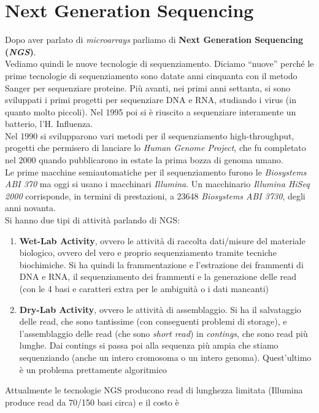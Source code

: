 \documentclass[a4paper,12pt, oneside]{book}
\begin{document}
\section{Next Generation Sequencing}
Dopo aver parlato di \textit{microarrays} parliamo di \textbf{Next Generation
  Sequencing (\textit{NGS})}.\\
Vediamo quindi le nuove tecnologie di sequenziamento. Diciamo ``nuove'' perché
le prime tecnologie di sequenziamento sono datate anni cinquanta con il metodo
Sanger per sequenziare proteine. Più avanti, nei primi anni settanta, si sono
sviluppati i primi progetti per sequenziare DNA e RNA, studiando i virus (in
quanto molto piccoli). Nel 1995 poi si è riuscito a sequenziare interamente un
batterio, l'H. Influenza.\\
Nel 1990 si svilupparono vari metodi per il sequenziamento high-throughput,
progetti che permisero di lanciare lo \textit{Human Genome Project}, che fu
completato nel 2000 quando pubblicarono in estate la prima bozza di genoma
umano. \\
Le prime macchine semiautomatiche per il sequenziamento furono le
\textit{Biosystems ABI 370} ma oggi si usano i macchinari \textit{Illumina}. Un
macchinario \textit{Illumina HiSeq 2000} corrisponde, in termini di prestazioni,
a 23648 \textit{Biosystems ABI 3730}, degli anni novanta.\\
Si hanno due tipi di attività parlando di NGS:
\begin{enumerate}
  \item \textbf{Wet-Lab Activity}, ovvero le attività di raccolta dati/misure
  del materiale biologico, ovvero del vero e proprio sequenziamento tramite
  tecniche biochimiche. Si ha
  quindi la frammentazione e l'estrazione dei frammenti di DNA e RNA, il
  sequenziamento dei frammenti e la generazione delle read (con le 4 basi e
  caratteri extra per le ambiguità o i dati mancanti)
  \item \textbf{Dry-Lab Activity}, ovvero le attività di assemblaggio. Si ha il
  salvataggio delle read, che sono tantissime (con conseguenti problemi di
  storage), e l'assemblaggio delle 
  read (che sono \textit{short read}) in \textit{contings}, che sono read più
  lunghe. Dai contings si passa poi alla sequenza più ampia che stiamo
  sequenziando (anche un intero cromosoma o un intero genoma). Quest'ultimo è un
  problema prettamente algoritmico
\end{enumerate}
Attualmente le tecnologie NGS producono read di lunghezza limitata (Illumina
produce read da 70/150 basi circa) e il costo è
\end{document}
